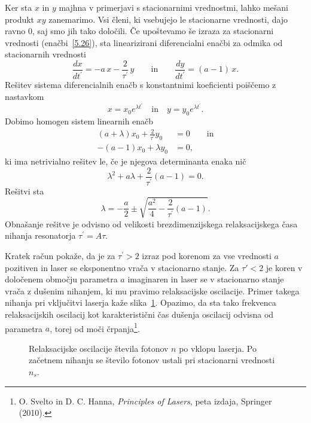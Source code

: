 Ker sta $x$ in $y$ majhna v primerjavi s stacionarnimi vrednostmi, lahko
mešani produkt $xy$ zanemarimo. Vsi členi, ki vsebujejo le stacionarne vrednosti,
dajo ravno 0, saj smo jih tako določili. Če upoštevamo še izraza 
za stacionarni vrednosti (enačbi~\ref{5.26}), 
sta linearizirani diferencialni enačbi za odmika od stacionarnih vrednosti 
\begin{equation}
\frac{dx}{dt^{\prime }} =-a\,x-\frac{2}{\tau ^{\prime }}\,y   \qquad \mathrm{in} \qquad
\frac{dy}{dt^{\prime }} =(a-1)\,x.
\label{5.28}
\end{equation}
Rešitev sistema diferencialnih enačb s konstantnimi
koeficienti poiščemo z nastavkom
\begin{equation}
x=x_{0}e^{\lambda t^{\prime }} \quad \mathrm{in} \quad 
y=y_{0}e^{\lambda t^{\prime }}.
\label{5.29}
\end{equation}
Dobimo homogen sistem linearnih enačb 
\begin{align}
(a+\lambda )x_{0}+\frac{2}{\tau ^{\prime }}y_{0} &=0  \label{5.30} \qquad \mathrm{in}\\
-(a-1)x_{0}+\lambda y_{0} &=0,
\end{align}
ki ima netrivialno rešitev le, če je njegova determinanta enaka nič
\begin{equation}
\lambda ^{2}+a\lambda +\frac{2}{\tau ^{\prime }}(a-1)=0.  
\label{5.301}
\end{equation}
Rešitvi sta 
\begin{equation}
\lambda =-\frac{a}{2}\pm \sqrt{\frac{a^{2}}{4}-\frac{2}{\tau ^{\prime }}(a-1)}.
\label{5.31}
\end{equation}
Obnašanje rešitve je odvisno od velikosti brezdimenzijskega relaksacijskega
časa nihanja resonatorja $\tau ^{\prime }=A\tau $. 

Kratek račun pokaže, da je 
za $\tau ^{\prime }>2$ izraz pod korenom za vse vrednosti $a$ pozitiven in laser 
se eksponentno vrača v stacionarno stanje. Za $\tau' <2$ je koren v določenem območju
parametra $a$ imaginaren in laser se v stacionarno stanje vrača z
dušenim nihanjem, ki mu pravimo relaksacijske 
oscilacije.
Primer takega nihanja 
pri vključitvi laserja kaže slika~\ref{fig:relax}. Opazimo, da sta tako 
frekvenca relaksacijskih oscilacij kot karakteristični čas dušenja oscilacij
odvisna od parametra $a$, torej od moči črpanja\footnote{O. Svelto in D. C. Hanna, 
{\it Principles of Lasers}, peta izdaja, 
Springer (2010).}.
\begin{figure}[h]
\centering
\def\svgwidth{80truemm} 

\caption{Relaksacijske oscilacije števila fotonov $n$ po vklopu laserja. Po začetnem
nihanju se število fotonov ustali pri stacionarni vrednosti $n_s$.}
\label{fig:relax}
\end{figure}

